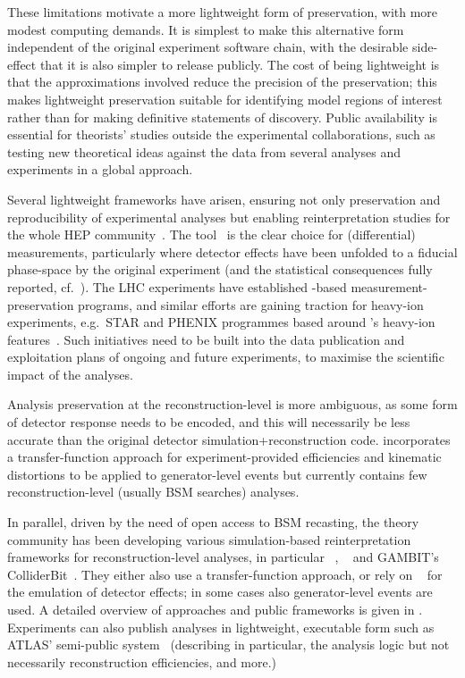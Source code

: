 \documentclass[11pt]{article}
\begin{document}
These limitations motivate a more lightweight form of preservation, with more modest computing demands. It is simplest to make this alternative form independent of the original experiment software chain, with the desirable side-effect that it is also simpler to release publicly. The cost of being lightweight is that the approximations involved reduce the precision of the preservation; this makes lightweight preservation suitable for identifying model regions of interest rather than for making definitive statements of discovery. Public availability is essential for theorists' studies outside the experimental collaborations, such as testing new theoretical ideas against the data from several analyses and experiments in a global approach.

Several lightweight frameworks have arisen, ensuring not only preservation and reproducibility of experimental analyses but enabling \gls{reinterpretation} studies for the whole \gls{HEP} community~\cite{LHCReinterpretationForum:2020xtr}. The \rivet tool~\cite{Bierlich:2019rhm} is the clear choice for (differential) measurements, particularly where detector effects have been unfolded to a fiducial phase-space by the original experiment (and the statistical consequences fully reported, cf.~). The \gls{LHC} experiments have established \rivet-based measurement-preservation programs, and similar efforts are gaining traction for heavy-ion experiments, e.g.~\gls{STAR} and \gls{PHENIX} programmes based around \rivet's heavy-ion features~\cite{Bierlich:2020wms}. Such initiatives need to be built into the data publication and exploitation plans of ongoing and future experiments, to maximise the scientific impact of the analyses.

Analysis preservation at the reconstruction-level is more ambiguous, as some form of detector response needs to be encoded, and this will necessarily be less accurate than the original detector simulation+reconstruction code.
\rivet incorporates a transfer-function approach for experiment-provided efficiencies and kinematic distortions to be applied to generator-level events but currently contains few reconstruction-level (usually \gls{BSM} searches) analyses.

In parallel, driven by the need of open access to \gls{BSM} recasting, the theory community has been developing various simulation-based reinterpretation frameworks for reconstruction-level analyses, in particular \checkmate~\cite{Drees:2013wra,Dercks:2016npn}, \madanalysis~\cite{Dumont:2014tja,Conte:2018vmg} and GAMBIT's ColliderBit~\cite{GAMBIT:2017qxg}. They either also use a transfer-function approach, or rely on \delphes~\cite{deFavereau:2013fsa} for the emulation of detector effects; in some cases also generator-level events are used. A detailed overview of approaches and public frameworks is given in \cite{LHCReinterpretationForum:2020xtr}.
%
Experiments can also publish analyses in lightweight, executable form such as \gls{ATLAS}' semi-public \simpleanalysis system~\cite{atlas:simpleanalysis}
(describing in particular, the analysis logic but not necessarily reconstruction efficiencies, and more.)
\end{document}
